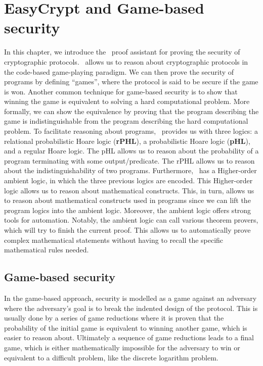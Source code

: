 \chapter{EasyCrypt and Game-based security}
\label{ch:EasyCrypt}
In this chapter, we introduce the \easycrypt\ proof assistant for proving the security
of cryptographic protocols. \easycrypt\ allows us to reason about cryptographic
protocols in the code-based game-playing paradigm. We can then prove the security of programs by defining
``games'', where the protocol is said to be secure if the game is won.
Another common technique for game-based security is to show that winning the game is
equivalent to solving a hard computational problem. More formally, we can show
the equivalence by proving that the program describing the game is indistinguishable
from the program describing the hard computational problem.
To facilitate reasoning about programs, \easycrypt\ provides us with three
logics: a relational probabilistic
Hoare logic (\textbf{rPHL}), a probabilistic Hoare logic (\textbf{pHL}), and a
regular Hoare logic.
The pHL allows us to reason about the probability of a program terminating with
some output/predicate.
The rPHL allows us to reason about the
indistinguishability of two programs.
Furthermore, \easycrypt\ has a Higher-order ambient logic, in which the three
previous logics are encoded.
This Higher-order logic allows us to reason about mathematical constructs. This,
in turn, allows us to reason about mathematical constructs used in programs
since we can lift the program logics into the ambient logic.
Moreover, the ambient logic offers strong tools for automation. Notably, the
ambient logic can call various theorem provers, which will try to finish the
current proof. This allows us to automatically prove complex mathematical
statements without having to recall the specific mathematical rules needed.

\section{Game-based security}
\label{sec:game-based-sec}
In the game-based approach, security is
modelled as a game against an adversary where the adversary's goal is to
break the indented design of the protocol.
This is usually done by a series of game reductions where it is proven that the
probability of the initial game is equivalent to winning another game, which is
easier to reason about.
Ultimately a sequence of game reductions leads to a final game, which is either
mathematically impossible for the adversary to win or equivalent to a
difficult problem, like the discrete logarithm problem.

